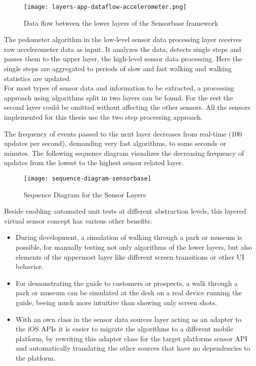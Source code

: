 \begin{figure}[H]
\centering
\texttt{[image: layers-app-dataflow-accelerometer.png]}
\caption{Data flow between the lower layers of the Sensorbase framework}
\label{fig:dataflow}
\end{figure}

The pedometer algorithm in the low-level sensor data processing layer receives raw accelerometer data as input. It analyzes the data, detects single steps and passes them to the upper layer, the high-level sensor data processing. Here the single steps are aggregated to periods of slow and fast walking and walking statistics are updated.\\
For most types of sensor data and information to be extracted, a processing approach using algorithms split in two layers can be found. For the rest the second layer could be omitted without affecting the other sensors. All the sensors implemented for this thesis use the two step processing approach.

The frequency of events passed to the next layer decreases from real-time (100 updates per second), demanding very fast algorithms, to some seconds or minutes. The following sequence diagram visualizes the decreasing frequency of updates from the lowest to the highest sensor related layer.

\begin{figure}[H]
\centering
\texttt{[image: sequence-diagram-sensorbase]}
\caption{Sequence Diagram for the Sensor Layers}
\end{figure}

Beside enabling automated unit tests at different abstraction levels, this layered virtual sensor concept has various other benefits:

\begin{itemize}
\item During development, a simulation of walking through a park or museum is possible, for manually testing not only algorithms of the lower layers, but also elements of the uppermost layer like different screen transitions or other UI behavior.
\item For demonstrating the guide to customers or prospects, a walk through a park or museum can be simulated at the desk on a real device running the guide, beeing much more intuitive than showing only screen shots.
\item With an own class in the sensor data sources layer acting as an adapter to the iOS APIs it is easier to migrate the algorithms to a different mobile platform, by rewriting this adapter class for the target platforms sensor API and automatically translating the other sources that have no dependencies to the platform.
\end{itemize}

